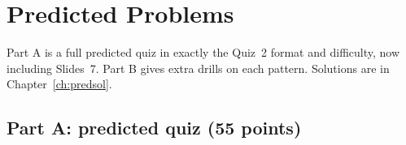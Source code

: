 \section{Predicted Problems}\label{ch:predicted}

Part A is a full predicted quiz in exactly the Quiz~2 format and difficulty,
now including Slides~7. Part B gives extra drills on each pattern. Solutions
are in Chapter~\ref{ch:predsol}.

\subsection{Part A: predicted quiz (55 points)}

